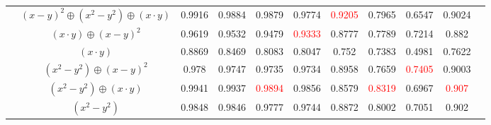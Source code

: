 \documentclass{article}
\begin{document}
\begin{table}[htbp]
\begin{tabular}{lcccccccccc}
& $(x-y)^2 \oplus (x^2-y^2) \oplus (x \cdot y)$ & 0.9916 & 0.9884 & 0.9879 & 0.9774 & \textcolor{red}{0.9205} & 0.7965 & 0.6547 & 0.9024 & \\

& $(x \cdot y) \oplus (x-y)^2$ & 0.9619 & 0.9532 & 0.9479 & \textcolor{red}{0.9333} & 0.8777 & 0.7789 & 0.7214 & 0.882 & \\

& $(x \cdot y)$ & 0.8869 & 0.8469 & 0.8083 & 0.8047 & 0.752 & 0.7383 & 0.4981 & 0.7622 & \\

& $(x^2-y^2) \oplus (x-y)^2$ & 0.978 & 0.9747 & 0.9735 & 0.9734 & 0.8958 & 0.7659 & \textcolor{red}{0.7405} & 0.9003 & \\

& $(x^2-y^2) \oplus (x \cdot y)$ & 0.9941 & 0.9937 & \textcolor{red}{0.9894} & 0.9856 & 0.8579 & \textcolor{red}{0.8319} & 0.6967 & \textcolor{red}{0.907} & \\

& $(x^2-y^2)$ & 0.9848 & 0.9846 & 0.9777 & 0.9744 & 0.8872 & 0.8002 & 0.7051 & 0.902 & \\
\bottomrule
\end{tabular}
\end{table}
\end{document}
